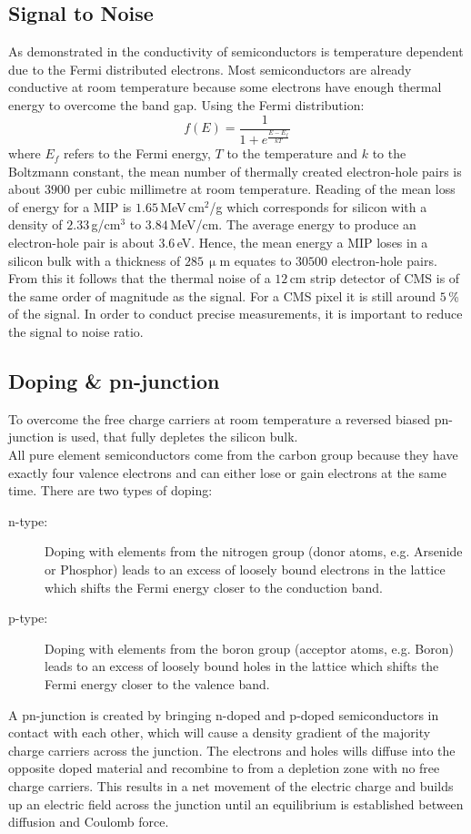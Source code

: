 \documentclass[british,11pt,a4paper]{memoir}
\begin{document}
\subsection{Signal to Noise}
As demonstrated in  the conductivity of semiconductors is temperature dependent due to the Fermi distributed electrons. Most semiconductors are already conductive at room temperature because some electrons have enough thermal energy to overcome the band gap. Using the Fermi distribution:
\begin{equation}
	f(E) = \frac{1}{1+e^{\frac{E-E_{f}}{kT} }}
\end{equation}
where $E_{f}$ refers to the Fermi energy, $T$ to the temperature and $k$ to the Boltzmann constant, the mean number of thermally created electron-hole pairs is about $3900$ per cubic millimetre at room temperature. Reading of  the mean loss of energy for a \ac{MIP} is $1.65\,$MeV\,cm$^{2}$/g which corresponds for silicon with a density of $2.33\,$g/cm$^{3}$ to $3.84\,$MeV/cm. The average energy to produce an electron-hole pair is about $3.6\,$eV. Hence, the mean energy a \ac{MIP} loses in a silicon bulk with a thickness of $285\,\upmu$m equates to $30500$ electron-hole pairs. From this it follows that the thermal noise of a $12\,$cm strip detector of \ac{CMS} is of the same order of magnitude as the signal. For a \ac{CMS} pixel it is still around $5\,$\% of the signal. In order to conduct precise measurements, it is important to reduce the signal to noise ratio.
\subsection{Doping \& pn-junction}
To overcome the free charge carriers at room temperature a reversed biased pn-junction is used, that fully depletes the silicon bulk.\\
All pure element semiconductors come from the carbon group because they have exactly four valence electrons and can either lose or gain electrons at the same time. There are two types of doping:
\begin{description}
	\item[n-type:]{Doping with elements from the nitrogen group (donor atoms, e.g. Arsenide or Phosphor) leads to an excess of loosely bound electrons in the lattice which shifts the Fermi energy closer to the conduction band.}
	\item[p-type:] Doping with elements from the boron group (acceptor atoms, e.g. Boron) leads to an excess of loosely bound holes in the lattice which shifts the Fermi energy closer to the valence band.
\end{description}
A pn-junction is created by bringing n-doped and p-doped semiconductors in contact with each other, which will cause a density gradient of the majority charge carriers across the junction. The electrons and holes wills diffuse into the opposite doped material and recombine to from a depletion zone with no free charge carriers. This results in a net movement of the electric charge and builds up an electric field across the junction until an equilibrium is established between diffusion and Coulomb force. 
\end{document}
